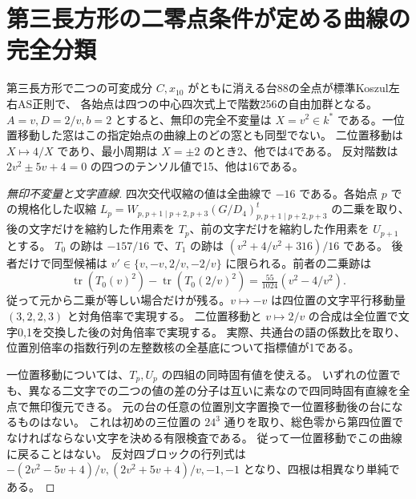 \section{第三長方形の二零点条件が定める曲線の完全分類}
\label{sec:parallel-double-zero-curve}
\begin{theorem}\label{thm:parallel-double-zero-curve}
第三長方形で二つの可変成分 $C,x_{10}$ がともに消える台88の全点が標準Koszul左右AS正則で、
各始点は四つの中心四次式上で階数256の自由加群となる。$A=v,D=2/v,b=2$ とすると、無印の完全不変量は
$X=v^2\in k^*$ である。一位置移動した窓はこの指定始点の曲線上のどの窓とも同型でない。
二位置移動は $X\mapsto4/X$ であり、最小周期は $X=\pm2$ のとき2、他では4である。
反対階数は $2v^2\pm5v+4=0$ の四つのテンソル値で15、他は16である。
\end{theorem}
\begin{proof}[無印不変量と文字直線]
四次交代収縮の値は全曲線で $-16$ である。各始点 $p$ での規格化した収縮
$L_p=W_{p,p+1\mid p+2,p+3}(G/D_4)_{p,p+1\mid p+2,p+3}^t$ の二乗を取り、
後の文字だけを縮約した作用素を $T_p$、前の文字だけを縮約した作用素を $U_{p+1}$ とする。
$T_0$ の跡は $-157/16$ で、$T_1$ の跡は $(v^2+4/v^2+316)/16$ である。
後者だけで同型候補は $v'\in\{v,-v,2/v,-2/v\}$ に限られる。前者の二乗跡は
\[
 \operatorname{tr}(T_0(v)^2)-\operatorname{tr}(T_0(2/v)^2)
 =\tfrac{55}{1024}(v^2-4/v^2).
\]
従って元から二乗が等しい場合だけが残る。$v\mapsto-v$ は四位置の文字平行移動量 $(3,2,2,3)$ と対角倍率で実現する。
二位置移動と $v\mapsto2/v$ の合成は全位置で文字0,1を交換した後の対角倍率で実現する。
実際、共通台の語の係数比を取り、位置別倍率の指数行列の左整数核の全基底について指標値が1である。

一位置移動については、$T_p,U_p$ の四組の同時固有値を使える。
いずれの位置でも、異なる二文字での二つの値の差の分子は互いに素なので四同時固有直線を全点で無印復元できる。
元の台の任意の位置別文字置換で一位置移動後の台になるものはない。
これは初めの三位置の $24^3$ 通りを取り、総色零から第四位置でなければならない文字を決める有限検査である。
従って一位置移動でこの曲線に戻ることはない。
反対四ブロックの行列式は $-(2v^2-5v+4)/v,(2v^2+5v+4)/v,-1,-1$ となり、四根は相異なり単純である。
\end{proof}

